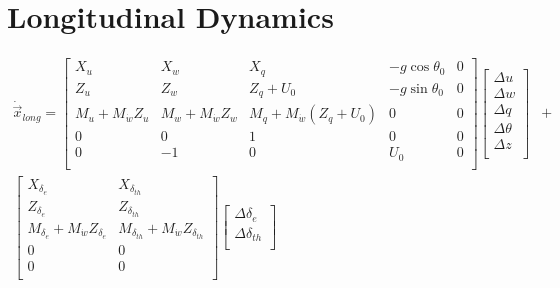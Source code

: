 \section{Longitudinal Dynamics}
\begin{align*}
    \dot{\vec{x}}_{long} =
    \left[ \begin{array}{ *{5}{c} }
            X_u                     & X_w                     & X_q                                          & -g \cos \theta_0 & 0 \\
            Z_u                     & Z_w                     & Z_q + U_0                                    & -g \sin \theta_0 & 0 \\
            M_u + M_{\dot{w}} Z_{u} & M_w + M_{\dot{w}} Z_{w} & M_q + M_{\dot{w}} \left( Z_{q} + U_0 \right) & 0                & 0 \\
            0                       & 0                       & 1                                            & 0                & 0 \\
            0                       & -1                      & 0                                            & U_0              & 0 \\
        \end{array} \right]
    \left[ \begin{array}{ *{1}{c} }
            \Delta u      \\
            \Delta w      \\
            \Delta q      \\
            \Delta \theta \\
            \Delta z      \\
        \end{array} \right] & + \\
    \left[ \begin{array}{ *{5}{c} }
            X_{\delta_e}                            & X_{\delta_{th}}                               \\
            Z_{\delta_e}                            & Z_{\delta_{th}}                               \\
            M_{\delta_e} + M_{\dot{w}} Z_{\delta_e} & M_{\delta_{th}} + M_{\dot{w}} Z_{\delta_{th}} \\
            0                                       & 0                                             \\
            0                                       & 0                                             \\
        \end{array} \right]
    \left[ \begin{array}{ *{1}{c} }
            \Delta \delta_e    \\
            \Delta \delta_{th} \\
        \end{array} \right] &   \\
\end{align*}

